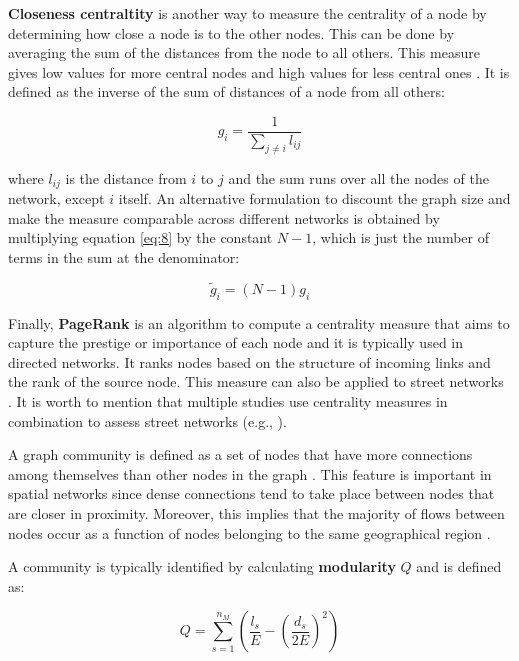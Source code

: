 \textbf{Closeness centraltity} is another way to measure the centrality of a node by determining how close a node is to the other nodes. This can be done by averaging the sum of the distances from the node to all others. This measure gives low values for more central nodes and high values for less central ones \cite{newman_2010}. It is defined as the inverse of the sum of distances of a node from all others:

\begin{equation} \label{eq:8}
g_i = \frac{1}{\sum_{j \neq i} l_{ij}}
\end{equation}

where $l_{ij}$ is the distance from $i$ to $j$ and the sum runs over all the nodes of the network, except $i$ itself. An alternative formulation to discount the graph size and make the measure comparable across different networks is obtained by multiplying equation \ref{eq:8} by the constant $N - 1$, which is just the number of terms in the sum at the denominator:

\begin{equation} \label{eq:9}
\tilde{g}_i = (N - 1)g_i
\end{equation}

Finally, \textbf{PageRank} is an algorithm to compute a centrality measure that aims to capture the prestige or importance of each node and it is typically used in directed networks. It ranks nodes based on the structure of incoming links and the rank of the source node. This measure can also be applied to street networks \cite{jiang_2006, agryzkov_2012, gleich_2014, chin-wen_2015}. It is worth to mention that multiple studies use centrality measures in combination to assess street networks (e.g., \cite{porta_2004, porta_2006, porta_2010, crucitti_urban_2006, crucitti_spatial_2006, sevtsuk_2012}).

A graph community is defined as a set of nodes that have more connections among themselves than other nodes in the graph \cite{fortunato_2010}. This feature is important in spatial networks since dense connections tend to take place between nodes that are closer in proximity. Moreover, this implies that the majority of flows between nodes occur as a function of nodes belonging to the same geographical region \cite{barthelemy_2018}.

A community is typically identified by calculating \textbf{modularity} $Q$ \cite{newman-girvan_2004} and is defined as:

\begin{equation}
Q = \sum_{s = 1}^{n_M}\left( \frac{l_s}{E} - (\frac{d_s}{2E})^2\right)
\end{equation}


